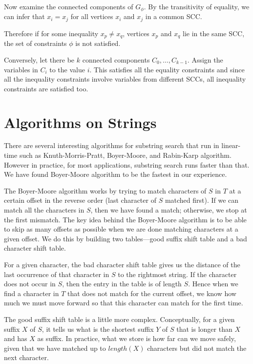 Now examine the connected components of $G_\phi$.
By the transitivity of equality, we can infer that $x_i = x_j$ for all
vertices $x_i$ and $x_j$ in a common SCC.

Therefore if for some inequality $x_p \neq x_q$, vertices
$x_p$ and $x_q$ lie in the same SCC, the set of constraints $\phi$ is not satisfied.

Conversely, let there be $k$ connected components $C_0,\ldots,C_{k-1}$.  Assign
the variables in $C_i$ to the value $i$. This satisfies all the equality constraints and since all the inequality constraints involve variables
from different SCCs, all inequality constraints are satisfied too.


\chapter{ Algorithms on Strings}

There are several interesting algorithms for substring search that run
in linear-time  such as Knuth-Morris-Pratt, Boyer-Moore, and
Rabin-Karp algorithm.  However in practice, for most applications, substring
search runs faster than that. We have found Boyer-Moore algorithm to
be the fastest in our experience. 

The Boyer-Moore algorithm works by trying to match characters of $S$
in $T$ at a certain offset in the reverse order (last character of
$S$ matched first). If we can match all the characters in $S$, then we
have found a match; otherwise, we stop at the first mismatch.  The key idea behind the Boyer-Moore algorithm is to be able to skip as
many offsets as possible when we are done matching characters at a
given offset. We do this by building two tables---good suffix shift table and a bad character shift table.

For a given character, the bad character shift table gives us the distance of the last
occurrence of that character in $S$ to the rightmost
string.  If the character does not occur in $S$, then the entry in the
table is of length  $S$.  Hence when we find a character in $T$ that
does not match for the current offset, we know how much we must move
forward so that this character can match for the first time.

The good suffix shift table is a little more complex. Conceptually, for a given
suffix $X$ of $S$, it tells us what is the shortest suffix $Y$ of $S$
that is longer than $X$ and has $X$ as suffix. In practice, what we
store is how far can we move safely, given that we have matched up to $length(X)$ characters but
did not match the next character. 





